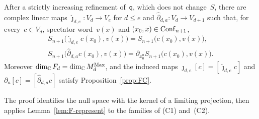 \begin{lemma}\label{lem:F2}
After a strictly increasing refinement of~$\mathsf q$, which does not change~$S$, there are complex linear maps $\hat\jmath_{d,e}:V_d\to V_e$ for $d\le e$ and $\hat\partial_{d,a}:V_d\to V_{d+1}$ such that, for every~$c\in V_d$, spectator word~$v(x)$ and $(x_0,x)\in\mathrm{Conf}_{n+1}$,
\begin{equation}\label{eq:F-calculus}
\begin{gathered}
S_{n+1}\bigl(\hat\jmath_{d,e}c(x_0),v(x)\bigr)=S_{n+1}\bigl(c(x_0),v(x)\bigr),\\
S_{n+1}\bigl(\hat\partial_{d,a}c(x_0),v(x)\bigr)=\partial_{x_0^a}S_{n+1}\bigl(c(x_0),v(x)\bigr).
\end{gathered}
\end{equation}
Moreover $\dim_{\mathbb{C}} F_d=\dim_{\mathbb{C}}M_{d}^{\mathrm{Max}}$, and the induced maps $\jmath_{d,e}[c]=[\hat\jmath_{d,e}c]$ and $\partial_a[c]=[\hat\partial_{d,a}c]$ satisfy Proposition~\ref{prop:FC}.
\end{lemma}
The proof identifies the null space with the kernel of a limiting projection, then applies Lemma~\ref{lem:F-represent} to the families of (C1) and~(C2).
